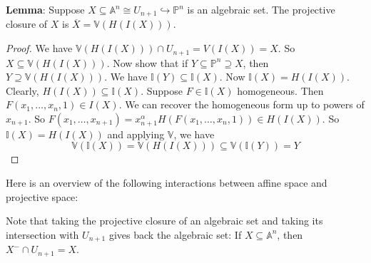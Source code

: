 \documentclass{report}
\begin{document}
\textbf{Lemma}: Suppose $X \subseteq \mathbb{A}^{n} \cong U_{n + 1} \hookrightarrow \mathbb{P}^{n}$ is an algebraic set. The projective closure of $X$ is $\overline{X} = \mathbb{V}(H(I(X)))$.
    \begin{proof}
        We have $\mathbb{V}(H(I(X))) \cap U_{n + 1} = V(I(X)) = X$. So $X \subseteq \mathbb{V}(H(I(X)))$. Now show that if $Y \subseteq \mathbb{P}^{n} \supseteq X$, then $Y \supseteq \mathbb{V}(H(I(X)))$. We have $\mathbb{I}(Y) \subseteq \mathbb{I}(X)$. Now $\mathbb{I}(X) = H(I(X))$. Clearly, $H(I(X)) \subseteq  \mathbb{I}(X)$. Suppose $F \in \mathbb{I}(X)$ homogeneous. Then $F(x_{1}, \ldots, x_{n}, 1) \in I(X)$. We can recover the homogeneous form up to powers of $x_{n + 1}$. So $F(x_{1}, \ldots, x_{n + 1}) = x_{n + 1}^{\alpha} H(F(x_{1}, \ldots, x_{n}, 1)) \in H(I(X))$. So $\mathbb{I}(X) = H(I(X))$ and applying $\mathbb{V}$, we have
            \begin{equation*}
                \mathbb{V}(\mathbb{I}(X)) = \mathbb{V}(H(I(X))) \subseteq \mathbb{V}(\mathbb{I}(Y)) = Y
            \end{equation*}
    \end{proof}

Here is an overview of the following interactions between affine space and projective space:
    \begin{center}
    \end{center}

Note that taking the projective closure of an algebraic set and taking its intersection with $U_{n + 1}$ gives back the algebraic set: If $X \subseteq \mathbb{A}^{n}$, then $X^{-} \cap U_{n + 1} = X$. 
\end{document}
